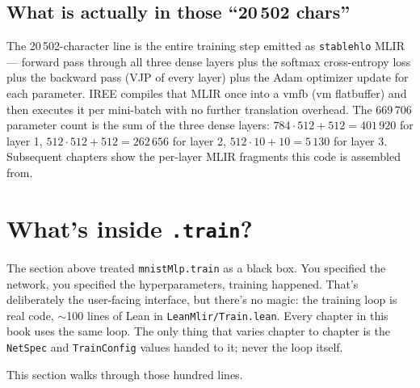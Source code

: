 \subsection*{What is actually in those ``20\,502 chars''}

The 20\,502-character line is the entire training step emitted as
\texttt{stablehlo} MLIR --- forward pass through all three dense
layers plus the softmax cross-entropy loss plus the backward pass
(VJP of every layer) plus the Adam optimizer update for each
parameter. IREE compiles that MLIR once into a vmfb (vm flatbuffer)
and then executes it per mini-batch with no further translation
overhead. The 669\,706 parameter count is the sum of the three
dense layers: $784 \cdot 512 + 512 = 401\,920$ for layer 1,
$512 \cdot 512 + 512 = 262\,656$ for layer 2, $512 \cdot 10 + 10 =
5\,130$ for layer 3. Subsequent chapters show the per-layer MLIR
fragments this code is assembled from.

\section{What's inside \texttt{.train}?}
\label{sec:mlp_inside_train}

The section above treated \texttt{mnistMlp.train} as a black box.
You specified the network, you specified the hyperparameters,
training happened. That's deliberately the user-facing interface,
but there's no magic: the training loop is real code, $\sim$100 lines
of Lean in \texttt{LeanMlir/Train.lean}. Every chapter in this book
uses the same loop. The only thing that varies chapter to chapter is
the \texttt{NetSpec} and \texttt{TrainConfig} values handed to it;
never the loop itself.

This section walks through those hundred lines.

